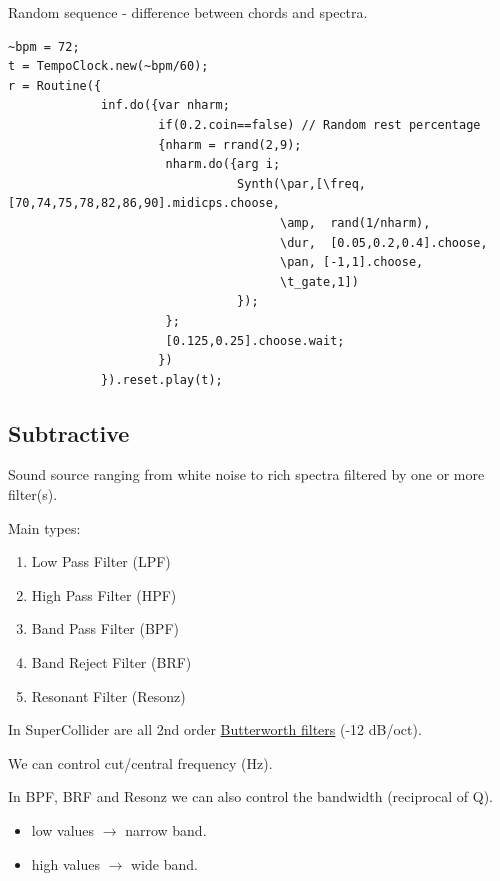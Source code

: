 Random sequence - difference between chords and spectra.

\begin{lstlisting}[frame=single] 
~bpm = 72;
t = TempoClock.new(~bpm/60); 
r = Routine({
             inf.do({var nharm;
                     if(0.2.coin==false) // Random rest percentage
                     {nharm = rrand(2,9);
                      nharm.do({arg i;
                                Synth(\par,[\freq, [70,74,75,78,82,86,90].midicps.choose, 
                                      \amp,  rand(1/nharm),
                                      \dur,  [0.05,0.2,0.4].choose,
                                      \pan, [-1,1].choose,
                                      \t_gate,1])
                                });
                      };
                      [0.125,0.25].choose.wait;              
                     })
             }).reset.play(t);
\end{lstlisting}

\subsection{Subtractive}\label{subtractive}

Sound source ranging from white noise to rich spectra filtered by one or more filter(s).

Main types:

\begin{enumerate}
\tightlist
\item Low Pass Filter (LPF) 
\item High Pass Filter (HPF) 
\item Band Pass Filter (BPF) 
\item Band Reject Filter (BRF) 
\item Resonant Filter (Resonz)
\end{enumerate}

In SuperCollider are all 2nd order \href{http://www.musicaecodice.it/gitmedia/emc/4_media/Butterworth_filters.pdf}{Butterworth filters} (-12 dB/oct).

We can control cut/central frequency (Hz).

In BPF, BRF and Resonz we can also control the bandwidth (reciprocal of Q).

\begin{itemize}
\tightlist 
\item low values \(\rightarrow\) narrow band. 
\item high values \(\rightarrow\) wide band.
\end{itemize}


